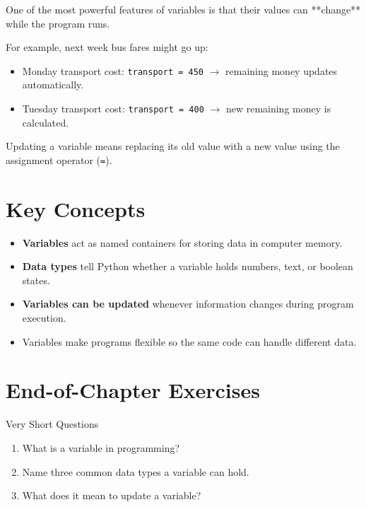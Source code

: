 One of the most powerful features of variables is that their values can **change** while the program runs.

For example, next week bus fares might go up:
\begin{itemize}
    \item Monday transport cost: \texttt{transport = 450} $\rightarrow$ remaining money updates automatically.
    \item Tuesday transport cost: \texttt{transport = 400} $\rightarrow$ new remaining money is calculated.
\end{itemize}

\begin{definition}
Updating a variable means replacing its old value with a new value using the assignment operator (\texttt{=}).
\end{definition}

\section{Key Concepts}

\begin{itemize}
    \item \textbf{Variables} act as named containers for storing data in computer memory.
    \item \textbf{Data types} tell Python whether a variable holds numbers, text, or boolean states.
    \item \textbf{Variables can be updated} whenever information changes during program execution.
    \item Variables make programs flexible so the same code can handle different data.
\end{itemize}

\section{End-of-Chapter Exercises}

\begin{exercise}{Very Short Questions}
\begin{enumerate}
    \item What is a variable in programming?
    \item Name three common data types a variable can hold.
    \item What does it mean to update a variable?
\end{enumerate}
\end{exercise}

